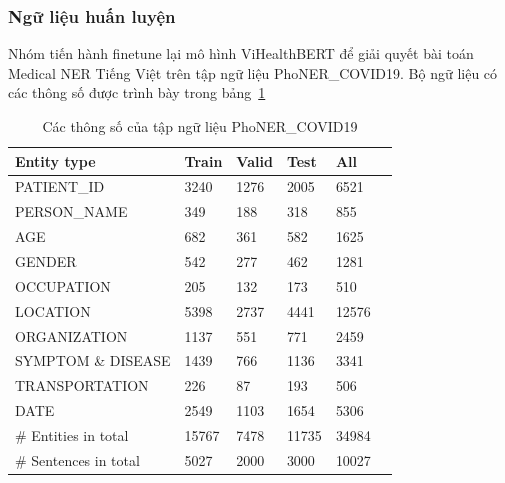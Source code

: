 \subsubsection{Ngữ liệu huấn luyện}
Nhóm tiến hành finetune lại mô hình ViHealthBERT để giải quyết bài toán Medical NER Tiếng Việt trên tập ngữ liệu PhoNER\_COVID19\cite{truong-etal-2021-covid}. Bộ ngữ liệu có các thông số được trình bày trong bảng~\ref{tab:covid-ner-vietnamese-stats}
\begin{table}
\centering
\begin{tabular}{|l|l|l|l|l|l|}
\hline
\textbf{Entity type} & \textbf{Train} & \textbf{Valid} & \textbf{Test} & \textbf{All} \\
\hline
PATIENT\_ID & 3240 & 1276 & 2005 & 6521 \\
\hdashline
PERSON\_NAME & 349 & 188 & 318 & 855 \\
\hdashline
AGE & 682 & 361 & 582 & 1625 \\
\hdashline
GENDER & 542 & 277 & 462 & 1281 \\
\hdashline
OCCUPATION & 205 & 132 & 173 & 510 \\
\hdashline
LOCATION & 5398 & 2737 & 4441 & 12576 \\
\hdashline
ORGANIZATION & 1137 & 551 & 771 & 2459 \\
\hdashline
SYMPTOM \& DISEASE & 1439 & 766 & 1136 & 3341 \\
\hdashline
TRANSPORTATION & 226 & 87 & 193 & 506 \\
\hdashline
DATE & 2549 & 1103 & 1654 & 5306 \\
\hline
\# Entities in total & 15767 & 7478 & 11735 & 34984 \\
\hline
\# Sentences in total & 5027 & 2000 & 3000 & 10027 \\
\hline
\end{tabular}
\caption{Các thông số của tập ngữ liệu PhoNER\_COVID19\cite{truong-etal-2021-covid}}
\label{tab:covid-ner-vietnamese-stats}
\end{table}

